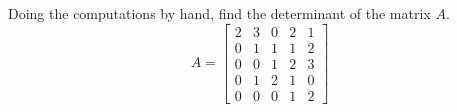 Doing the computations by hand, find the determinant of the matrix $A$. 
%
\begin{equation*}
A= 
\begin{bmatrix}
2 & 3 & 0 & 2 & 1\\
0 & 1 & 1 & 1 & 2\\
0 & 0 & 1 & 2 & 3\\
0 & 1 & 2 & 1 & 0\\
0 & 0 & 0 & 1 & 2
\end{bmatrix}
\end{equation*}